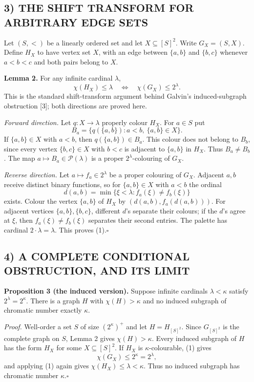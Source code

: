 \subsection*{3) THE SHIFT TRANSFORM FOR ARBITRARY EDGE SETS}
Let $(S,<)$ be a linearly ordered set and let $X\subseteq[S]^2$. Write $G_X=(S,X)$. Define $H_X$ to have vertex set $X$, with an edge between $\{a,b\}$ and $\{b,c\}$ whenever $a<b<c$ and both pairs belong to $X$.

\textbf{Lemma 2.} For any infinite cardinal $\lambda$,
\[
\chi(H_X)\le\lambda\quad\Longleftrightarrow\quad\chi(G_X)\le2^\lambda.\tag{1}
\]
This is the standard shift-transform argument behind Galvin's induced-subgraph obstruction [3]; both directions are proved here.

\emph{Forward direction.} Let $q:X\to\lambda$ properly colour $H_X$. For $a\in S$ put
\[
B_a=\{q(\{a,b\}):a<b,\ \{a,b\}\in X\}.
\]
If $\{a,b\}\in X$ with $a<b$, then $q(\{a,b\})\in B_a$. This colour does not belong to $B_b$, since every vertex $\{b,c\}\in X$ with $b<c$ is adjacent to $\{a,b\}$ in $H_X$. Thus $B_a\ne B_b$. The map $a\mapsto B_a\in\mathcal P(\lambda)$ is a proper $2^\lambda$-colouring of $G_X$.

\emph{Reverse direction.} Let $a\mapsto f_a\in2^\lambda$ be a proper colouring of $G_X$. Adjacent $a,b$ receive distinct binary functions, so for $\{a,b\}\in X$ with $a<b$ the ordinal
\[
d(a,b)=\min\{\xi<\lambda:f_a(\xi)\ne f_b(\xi)\}
\]
exists. Colour the vertex $\{a,b\}$ of $H_X$ by $(d(a,b),f_a(d(a,b)))$. For adjacent vertices $\{a,b\},\{b,c\}$, different $d$'s separate their colours; if the $d$'s agree at $\xi$, then $f_a(\xi)\ne f_b(\xi)$ separates their second entries. The palette has cardinal $2\cdot\lambda=\lambda$. This proves (1).\hfill$\square$

\subsection*{4) A COMPLETE CONDITIONAL OBSTRUCTION, AND ITS LIMIT}
\textbf{Proposition 3 (the induced version).} Suppose infinite cardinals $\lambda<\kappa$ satisfy $2^\lambda=2^\kappa$. There is a graph $H$ with $\chi(H)>\kappa$ and no induced subgraph of chromatic number exactly $\kappa$.

\emph{Proof.} Well-order a set $S$ of size $(2^\kappa)^+$ and let $H=H_{[S]^2}$. Since $G_{[S]^2}$ is the complete graph on $S$, Lemma 2 gives $\chi(H)>\kappa$. Every induced subgraph of $H$ has the form $H_X$ for some $X\subseteq[S]^2$. If $H_X$ is $\kappa$-colourable, (1) gives
\[
\chi(G_X)\le2^\kappa=2^\lambda,
\]
and applying (1) again gives $\chi(H_X)\le\lambda<\kappa$. Thus no induced subgraph has chromatic number $\kappa$.\hfill$\square$

